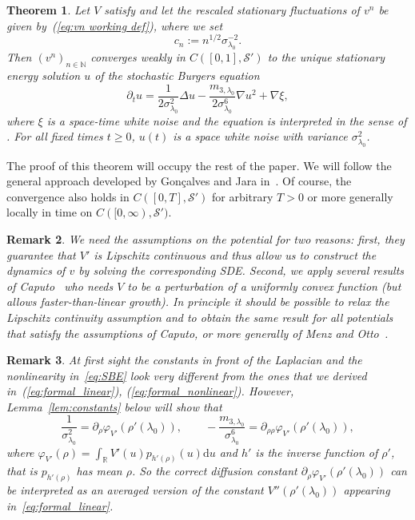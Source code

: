 \documentclass[11pt, a4paper]{article}
\newcommand{\assign}{:=}
\newcommand{\mathd}{\mathrm{d}}
\newtheorem{theorem}{Theorem}[section]
\newtheorem{remark}[theorem]{Remark}
\newcommand{\CS}{\mathscr{S}}
\newcommand{\R}{\mathbb{R}}
\newcommand{\1}{\mathbf{1}}
\begin{document}
\begin{theorem}\label{thm:main result}
  Let $V$ satisfy \assumptionV and
  let the rescaled stationary fluctuations of $v^n$ be given by~(\ref{eq:vn working def}), where we set
  \[ c_n \assign n^{1 / 2} \sigma_{\lambda_0}^{-2} . \]
  Then $(v^n)_{n \in \mathbb{N}}$ converges weakly in $C \left( [0, 1],
  \CS' \right)$ to the unique stationary energy solution $u$ of the
  stochastic Burgers equation
  \begin{equation}\label{eq:SBE}
     \partial_t u = \frac{ 1}{2 \sigma_{\lambda_0}^{2}}
     \Delta u - \frac{m_{3,\lambda_0}}{2 \sigma_{\lambda_0}^6} \nabla u^2 + \nabla \xi,
  \end{equation}
  where $\xi$ is a space-time white noise and the equation is interpreted in
  the sense of \cite{bib:energyUniqueness}. For all fixed times $t\ge 0$,
  $u (t)$ is a space white noise with variance $\sigma_{\lambda_0}^2$.
\end{theorem}

The proof of this theorem will occupy the rest of the paper. We will follow the general approach developed by Gon\c calves and Jara in~\cite{bib:goncalvesJara}. Of course, the convergence also holds in $C([0,T], \CS')$ for arbitrary $T>0$ or more generally locally in time on $C([0,\infty), \CS')$.

\begin{remark}
   We need the assumptions on the potential for two reasons: first, they guarantee that $V'$ is Lipschitz continuous and thus allow us to construct the dynamics of $v$ by solving the corresponding SDE. Second, we apply several results of Caputo~\cite{bib:caputo} who needs $V$ to be a perturbation of a uniformly convex function (but allows faster-than-linear growth). In principle it should be possible to relax the Lipschitz continuity assumption and to obtain the same result for all potentials that satisfy the assumptions of Caputo, or more generally of Menz and Otto~\cite{bib:menzOtto}.
\end{remark}

\begin{remark}
   At first sight the constants in front of the Laplacian and the nonlinearity in~\eqref{eq:SBE} look very different from the ones that we derived in~{\normalfont (\ref{eq:formal_linear}), (\ref{eq:formal_nonlinear})}. However, Lemma~\ref{lem:constants} below will show that
   \[
      \frac{1}{\sigma_{\lambda_0}^{2}} = \partial_{\rho} \varphi_{V'}(\rho'(\lambda_0)), \qquad -\frac{m_{3,\lambda_0}}{\sigma_{\lambda_0}^6} = \partial_{\rho\rho} \varphi_{V'}(\rho'(\lambda_0)),
   \]
   where $\varphi_{V'}(\rho) = \int_\R V'(u) p_{h'(\rho)}(u) \mathd u$ and $h'$ is the inverse function of $\rho'$, that is $p_{h'(\rho)}$ has mean $\rho$. So the correct diffusion constant $\partial_{\rho} \varphi_{V'}(\rho'(\lambda_0))$ can be interpreted as an averaged version of the constant $V''(\rho'(\lambda_0))$ appearing in~\eqref{eq:formal_linear}.
\end{remark}
\end{document}
